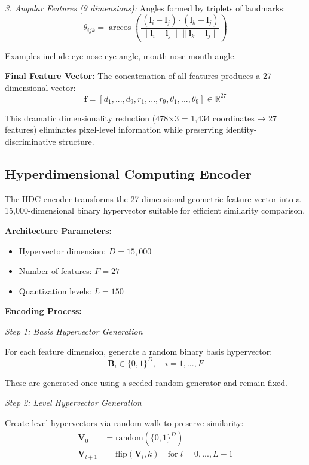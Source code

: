 \documentclass[a4paper,12pt]{article}
\begin{document}
\textit{3. Angular Features (9 dimensions):}
Angles formed by triplets of landmarks:
\begin{equation}
\theta_{ijk} = \arccos\left(\frac{(\mathbf{l}_i - \mathbf{l}_j) \cdot (\mathbf{l}_k - \mathbf{l}_j)}{\|\mathbf{l}_i - \mathbf{l}_j\| \|\mathbf{l}_k - \mathbf{l}_j\|}\right)
\end{equation}

Examples include eye-nose-eye angle, mouth-nose-mouth angle.

\textbf{Final Feature Vector:} The concatenation of all features produces a 27-dimensional vector:
\begin{equation}
\mathbf{f} = [d_1, ..., d_9, r_1, ..., r_9, \theta_1, ..., \theta_9] \in \mathbb{R}^{27}
\end{equation}

This dramatic dimensionality reduction (478×3 = 1,434 coordinates → 27 features) eliminates pixel-level information while preserving identity-discriminative structure.

\subsection{Hyperdimensional Computing Encoder}

The HDC encoder transforms the 27-dimensional geometric feature vector into a 15,000-dimensional binary hypervector suitable for efficient similarity comparison.

\textbf{Architecture Parameters:}
\begin{itemize}
    \item Hypervector dimension: $D = 15,000$
    \item Number of features: $F = 27$
    \item Quantization levels: $L = 150$
\end{itemize}

\textbf{Encoding Process:}

\textit{Step 1: Basis Hypervector Generation}

For each feature dimension, generate a random binary basis hypervector:
\begin{equation}
\mathbf{B}_i \in \{0,1\}^D, \quad i = 1, ..., F
\end{equation}

These are generated once using a seeded random generator and remain fixed.

\textit{Step 2: Level Hypervector Generation}

Create level hypervectors via random walk to preserve similarity:
\begin{align}
\mathbf{V}_0 &= \text{random}(\{0,1\}^D) \\
\mathbf{V}_{l+1} &= \text{flip}(\mathbf{V}_l, k) \quad \text{for } l = 0, ..., L-1
\end{align}
\end{document}
